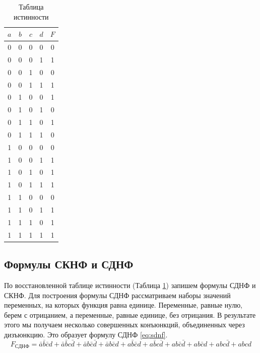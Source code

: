 \documentclass[a4paper]{article}
\begin{document}
    \begin{table}[h] 
	    \begin{center}
        \begin{tabular}{ | c | c | c | c | c | }
            \hline
            $ a $ & $ b $ & $ c $ & $ d $ & $ F $ \\
            \hline
            0     & 0     & 0     & 0     & 0     \\
            \hline
            0     & 0     & 0     & 1     & 1     \\
            \hline
            0     & 0     & 1     & 0     & 0     \\
            \hline
            0     & 0     & 1     & 1     & 1     \\
            \hline
            0     & 1     & 0     & 0     & 1     \\
            \hline
            0     & 1     & 0     & 1     & 0     \\
            \hline
            0     & 1     & 1     & 0     & 1     \\
            \hline
            0     & 1     & 1     & 1     & 0     \\
            \hline
            1     & 0     & 0     & 0     & 0     \\
            \hline
            1     & 0     & 0     & 1     & 1     \\
            \hline
            1     & 0     & 1     & 0     & 1     \\
            \hline
            1     & 0     & 1     & 1     & 1     \\
            \hline
            1     & 1     & 0     & 0     & 0     \\
            \hline
            1     & 1     & 0     & 1     & 1     \\
            \hline
            1     & 1     & 1     & 0     & 1     \\
            \hline
            1     & 1     & 1     & 1     & 1     \\
            \hline
        \end{tabular}
    	\end{center}
    	\caption{Таблица истинности}
    	\label{tab:truth}
	\end{table}

	\subsection{Формулы СКНФ и СДНФ}
	По восстановленной таблице истинности (Таблица \ref{tab:truth}) запишем формулы СДНФ и СКНФ. 
	Для построения формулы СДНФ рассматриваем наборы значений переменных, на которых функция равна единице. Переменные, равные нулю, берем с отрицанием, а переменные, равные единице, без отрицания. В результате этого мы получаем несколько совершенных конъюнкций, объединенных через дизъюнкцию. Это образует формулу СДНФ \eqref{eq:sdnf}.
	\begin{equation} \label{eq:sdnf}
			F_{СДНФ}=\bar a \bar b \bar c d  + \bar a \bar b c \bar d + \bar a b \bar c \bar d + \bar a b \bar c d + a \bar b \bar c d + a \bar b c \bar d + ab \bar c \bar d + ab \bar c d  + abc \bar d + abcd
	\end{equation} 
\end{document}
